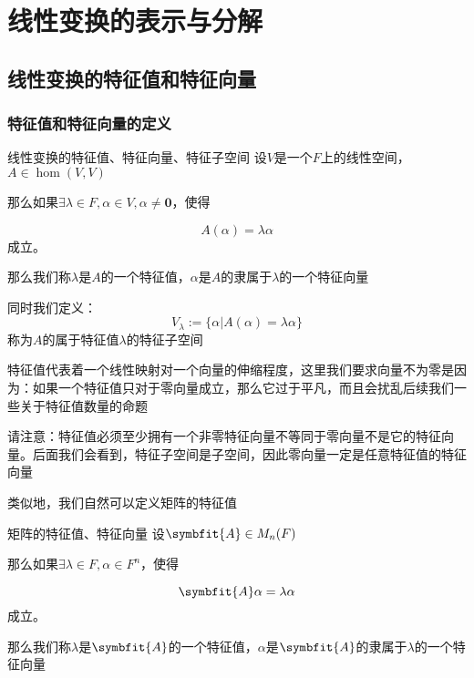\documentclass[12pt, a4paper, oneside, UTF8]{ctexbook}
\begin{document}
% 
\else
\fi
\chapter{线性变换的表示与分解}
	\section{线性变换的特征值和特征向量}
		\subsection{特征值和特征向量的定义}
			\begin{defn}{线性变换的特征值、特征向量、特征子空间}{}
				设$V$是一个$F$上的线性空间，$A \in \hom(V,V)$

				那么如果$\exists \lambda \in F,\alpha \in V,\alpha \neq \mathbf{0}$，使得

				\begin{equation}
					A(\alpha )=\lambda \alpha 
				\end{equation}
				成立。

				那么我们称$\lambda $是$A$的一个特征值，$\alpha $是$A$的隶属于$\lambda $的一个特征向量

				同时我们定义：
				\begin{equation}
					V_\lambda := \{\alpha | A(\alpha )=\lambda \alpha \}
				\end{equation}
				称为$A$的属于特征值$\lambda $的特征子空间
			\end{defn}
			特征值代表着一个线性映射对一个向量的伸缩程度，这里我们要求向量不为零是因为：如果一个特征值只对于零向量成立，那么它过于平凡，而且会扰乱后续我们一些关于特征值数量的命题

			请注意：特征值必须至少拥有一个非零特征向量不等同于零向量不是它的特征向量。后面我们会看到，特征子空间是子空间，因此零向量一定是任意特征值的特征向量

			类似地，我们自然可以定义矩阵的特征值
			\begin{defn}{矩阵的特征值、特征向量}{}
				设$\symbfit{A} \in M_n(F)$

				那么如果$\exists \lambda \in F,\alpha \in F^n$，使得

				\begin{equation}
					\symbfit{A}\alpha =\lambda \alpha 
				\end{equation}
				成立。

				那么我们称$\lambda $是$\symbfit{A}$的一个特征值，$\alpha $是$\symbfit{A}$的隶属于$\lambda $的一个特征向量
			\end{defn}
\end{document}
